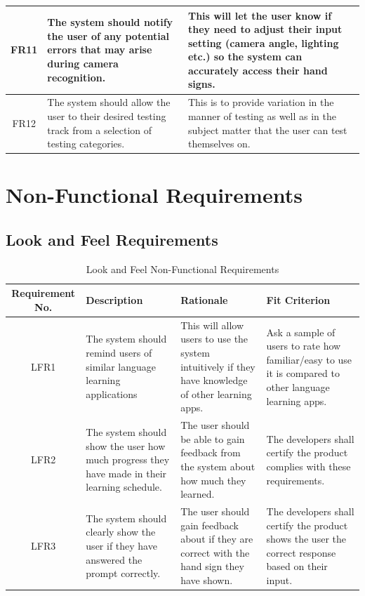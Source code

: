 \documentclass[12pt, titlepage]{article}
\begin{document}
\begin{longtable}{| c | p{4cm}| p{6cm}|}
    \hline
    FR11 & The system should notify the user of any potential errors that may arise during camera recognition. & This will let the user know if they need to adjust their input setting (camera angle, lighting etc.) so the system can accurately access their hand signs. \\
    \hline
    FR12 & The system should allow the user to their desired testing track from a selection of testing categories. & This is to provide variation in the manner of testing as well as in the subject matter that the user can test themselves on. \\
    \bottomrule
\end{longtable}

\section{Non-Functional Requirements}

\subsection{Look and Feel Requirements}

\begin{table}[H]
\caption{Look and Feel Non-Functional Requirements}
\noindent \begin{tabular}{| c | p{3cm}| p{3cm}| p{3cm}|}
\hline 
\textbf{Requirement No.} & \textbf{Description} & \textbf{Rationale} & \textbf{Fit Criterion}\\
\hline
LFR1 & The system should remind users of similar language learning applications & This will allow users to use the system intuitively if they have knowledge of other learning apps. & Ask a sample of users to rate how familiar/easy to use it is compared to other language learning apps. \\
\hline
LFR2 & The system should show the user how much progress they have made in their learning schedule. & The user should be able to gain feedback from the system about how much they learned. & The developers shall certify the product complies with these requirements. \\
\hline
LFR3 & The system should clearly show the user if they have answered the prompt correctly. & The user should gain feedback about if they are correct with the hand sign they have shown. & The developers shall certify the product shows the user the correct response based on their input. \\
\bottomrule
\end{tabular}
\end{table}
\end{document}
